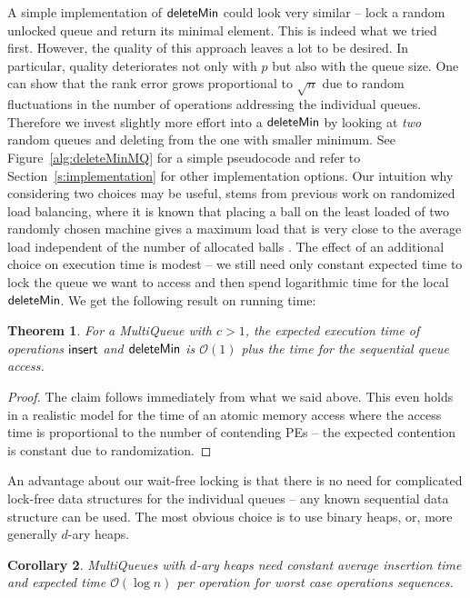 \documentclass[a4paper,12pt]{article}
\newcommand{\Id}[1]{\ensuremath{\text{{\sf #1}}}}
\newcommand{\Oh}[1]{\mathcal{O}\!\left( #1\right)}
\newtheorem{theorem}{Theorem}
\newtheorem{corollary}[theorem]{Corollary}
\begin{document}
A simple implementation of \Id{deleteMin} could look very similar -- lock a random unlocked queue and return its minimal element. This is indeed what we tried first. However, the quality of this approach leaves a lot to be desired. In particular, quality deteriorates not only with $p$ but also with the queue size. One can show that the rank error grows proportional to $\sqrt{n}$ due to random
fluctuations in the number of operations addressing the individual queues.
Therefore we invest slightly more effort into a \Id{deleteMin} by looking at \emph{two} random queues and deleting from the one with smaller minimum. See Figure~\ref{alg:deleteMinMQ} for a simple pseudocode and refer to Section~\ref{s:implementation} for other implementation options.  Our intuition why considering two choices 
may be useful, stems from previous work on randomized load balancing, where it is known that placing a ball on the least loaded of two randomly chosen machine gives a maximum load that is very close to the average load independent of the number of allocated balls \cite{BCSV00}.
The effect of an additional choice on execution time is modest -- we still need only constant expected time to lock the queue we want to access and then spend logarithmic time for the local \Id{deleteMin}. We get the following result on 
running time:

\begin{theorem}
For a MultiQueue with $c>1$, the expected execution time of operations \Id{insert} and \Id{deleteMin} is $\Oh{1}$ plus the time for the sequential queue access.
\end{theorem}
\begin{proof}
The claim follows immediately from what we said above. This even holds in a realistic model for the time of an atomic memory access where
the access time is proportional to the number of contending PEs --
the expected contention is constant due to randomization.
\end{proof}

An advantage about our wait-free locking is that there is no need for complicated lock-free data structures for the individual queues -- any known sequential data structure can be used. The most obvious choice is to use binary heaps, or, more generally $d$-ary heaps.

\begin{corollary}
MultiQueues with $d$-ary heaps need constant average insertion time and 
expected time $\Oh{\log n}$ per operation for worst case operations sequences.
\end{corollary}
 
\end{document}
